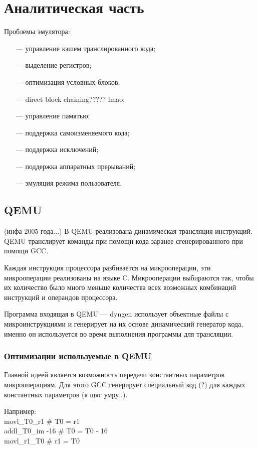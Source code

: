 \section{Аналитическая часть}

Проблемы эмулятора:
\begin{itemize}[leftmargin=1.6\parindent]
	\item[---] управление кэшем транслированного кода;
	\item[---] выделение регистров;
	\item[---] оптимизация условных блоков;
	\item[---] direct block chaining????? lmao;
	\item[---] управление памятью;
	\item[---] поддержка самоизменяемого кода;
	\item[---] поддержка исключений;
	\item[---] поддержка аппаратных прерываний;
	\item[---] эмуляция режима пользователя.
\end{itemize}

\subsection{QEMU}

(инфа 2005 года...)
В QEMU реализована динамическая трансляция инструкций. QEMU транслирует команды при помощи кода заранее сгенерированного при помощи GCC.

Каждая инструкция процессора разбивается на микрооперации, эти микрооперации реализованы на языке C. Микрооперации выбираются так, чтобы их количество было много меньше количества всех возможных комбинаций инструкций и операндов процессора.

Программа входящая в QEMU --- dyngen использует объектные файлы с микроинструкциями и генерирует на их основе динамический генератор кода, именно он используется во время выполнения программы для трансляции. \cite{qemu}

\subsubsection{Оптимизации используемые в QEMU }

Главной идеей является возможность передачи константных параметров микрооперациям. Для этого GCC генерирует специальный код (?) для каждых константных параметров (я щяс умру..).

Например:\\
		movl\_T0\_r1 \# T0 = r1\\
		addl\_T0\_im -16 \# T0 = T0 - 16\\
		movl\_r1\_T0 \# r1 = T0\\

